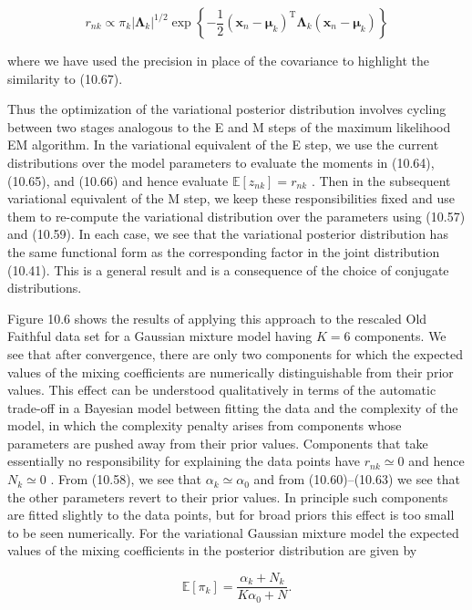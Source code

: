 \documentclass[
  10
]{article}
\begin{document}
\[
r _ {n k} \propto \pi_ {k} | \boldsymbol {\Lambda} _ {k} | ^ {1 / 2} \exp \left\{- \frac {1}{2} (\mathbf {x} _ {n} - \pmb {\mu} _ {k}) ^ {\mathrm{T}} \pmb {\Lambda} _ {k} (\mathbf {x} _ {n} - \pmb {\mu} _ {k}) \right\}\tag{10.68}
\]

where we have used the precision in place of the covariance to highlight
the similarity to (10.67).

Thus the optimization of the variational posterior distribution involves
cycling between two stages analogous to the E and M steps of the maximum
likelihood EM algorithm. In the variational equivalent of the E step, we
use the current distributions over the model parameters to evaluate the
moments in (10.64), (10.65), and (10.66) and hence evaluate
\(\mathbb { E } [ z _ { n k } ] = r _ { n k }\) . Then in the subsequent
variational equivalent of the M step, we keep these responsibilities
fixed and use them to re-compute the variational distribution over the
parameters using (10.57) and (10.59). In each case, we see that the
variational posterior distribution has the same functional form as the
corresponding factor in the joint distribution (10.41). This is a
general result and is a consequence of the choice of conjugate
distributions.

Figure 10.6 shows the results of applying this approach to the rescaled
Old Faithful data set for a Gaussian mixture model having \(K = 6\)
components. We see that after convergence, there are only two components
for which the expected values of the mixing coefficients are numerically
distinguishable from their prior values. This effect can be understood
qualitatively in terms of the automatic trade-off in a Bayesian model
between fitting the data and the complexity of the model, in which the
complexity penalty arises from components whose parameters are pushed
away from their prior values. Components that take essentially no
responsibility for explaining the data points have
\(r _ { n k } \simeq 0\) and hence \(N _ { k } \simeq 0\) . From
(10.58), we see that \(\alpha _ { k } \simeq \alpha _ { 0 }\) and from
(10.60)--(10.63) we see that the other parameters revert to their prior
values. In principle such components are fitted slightly to the data
points, but for broad priors this effect is too small to be seen
numerically. For the variational Gaussian mixture model the expected
values of the mixing coefficients in the posterior distribution are
given by

\[
\mathbb {E} [ \pi_ {k} ] = \frac {\alpha_ {k} + N _ {k}}{K \alpha_ {0} + N}.\tag{10.69}
\]
\end{document}
